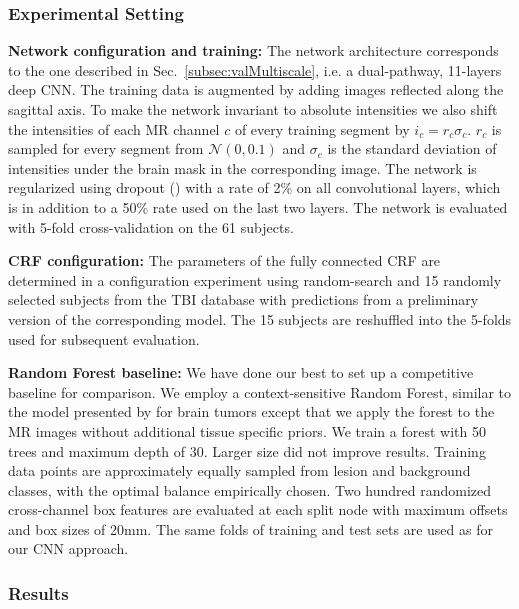 \documentclass[preprint,authoryear,12pt]{elsarticle}
\begin{document}
\subsubsection{Experimental Setting}
\label{subsubsec:tbiExperimentalSetting}

\textbf{Network configuration and training:} The network architecture corresponds to the one described in Sec.~\ref{subsec:valMultiscale}, i.e. a dual-pathway, 11-layers deep CNN. The training data is augmented by adding images reflected along the sagittal axis. To make the network invariant to absolute intensities we also shift the intensities of each MR channel $c$ of every training segment by $i_c = r_c \sigma_c$. $r_c$ is sampled for every segment from $\mathcal{N}(0,0.1)$ and $\sigma_c$ is the standard deviation of intensities under the brain mask in the corresponding image. The network is regularized using dropout (\cite{hinton2012dropout}) with a rate of 2\% on all convolutional layers, which is in addition to a 50\% rate used on the last two layers. The network is evaluated with 5-fold cross-validation on the 61 subjects.

\textbf{CRF configuration:} The parameters of the fully connected CRF are determined in a configuration experiment using random-search and 15 randomly selected subjects from the TBI database with predictions from a preliminary version of the corresponding model. The 15 subjects are reshuffled into the 5-folds used for subsequent evaluation.

\textbf{Random Forest baseline:} We have done our best to set up a competitive baseline for comparison. We employ a context-sensitive Random Forest, similar to the model presented by \cite{Zikic2012} for brain tumors except that we apply the forest to the MR images without additional tissue specific priors. We train a forest with 50 trees and maximum depth of 30. Larger size did not improve results. Training data points are approximately equally sampled from lesion and background classes, with the optimal balance empirically chosen. Two hundred randomized cross-channel box features are evaluated at each split node with maximum offsets and box sizes of 20mm. The same folds of training and test sets are used as for our CNN approach.

\subsubsection{Results}
\label{subsec:resTbi}
\end{document}
